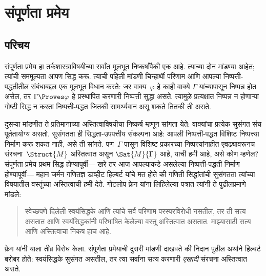 \chapter{संपूर्णता प्रमेय}\label{fol:com::chap}









\section{परिचय}\label{fol:com:int:sec}

संपूर्णता प्रमेय हा तर्कशास्त्राविषयीच्या सर्वांत मूलभूत निष्कर्षांपैकी एक
आहे. त्याच्या दोन मांडण्या आहेत; त्यांची सममूल्यता आपण सिद्ध करू. त्याची
पहिली मांडणी चिन्हार्थी परिणाम आणि आपल्या निष्पत्ती-पद्धतीतील संबंधाबद्दल
एक मूलभूत विधान करते: जर वाक्य~$\varphi$ हे काही वाक्ये
$\Gamma$ यांच्यापासून निष्पन्न होत असेल, तर $\Gamma \Proves \varphi$ हे
प्रस्थापित करणारी निष्पत्ती सुद्धा असते. त्यामुळे प्रत्यक्षात निष्पन्न
न होणाऱ्या गोष्टी सिद्ध न करता निष्पत्ती-पद्धत जितकी सामर्थ्यवान असू
शकते तितकी ती असते.

दुसऱ्या मांडणीत ते प्रतिमानाच्या अस्तित्वाविषयीचा निष्कर्ष म्हणून सांगता येते:
वाक्यांचा प्रत्येक सुसंगत संच पूर्ततायोग्य असतो. सुसंगतता ही
सिद्धता-उपपत्तीय संकल्पना आहे: आपली निष्पत्ती-पद्धत विशिष्ट
निष्पत्त्या निर्माण करू शकत नाही, असे ती सांगते. पण~$\Gamma$ पासून
विशिष्ट प्रकारच्या निष्पत्त्यांनाहीत एवढ्यावरूनच
संरचना~$\Struct{M}$
अस्तित्वात असून $\Sat{M}{\Gamma}$ आहे, याची हमी
आहे, असे कोण म्हणेल? संपूर्णता प्रमेय प्रथम सिद्ध होण्यापूर्वी---
खरे तर आज आपल्याकडे असलेल्या निष्पत्ती-पद्धती निर्माण होण्यापूर्वी---
महान जर्मन गणितज्ञ डाव्हीट हिल्बर्ट यांचे मत होते की गणिती सिद्धांतांची
सुसंगतता त्यांच्या विषयातील वस्तूंच्या अस्तित्वाची हमी देते. गोटलोप फ्रेग
यांना लिहिलेल्या पत्रात त्यांनी ते पुढीलप्रमाणे मांडले:
\begin{quote}
  स्वेच्छपणे दिलेली स्वयंसिद्धके आणि त्यांचे सर्व परिणाम परस्परविरोधी नसतील,
  तर ती सत्य असतात आणि स्वयंसिद्धकांनी परिभाषित केलेल्या वस्तू अस्तित्वात
  असतात. माझ्यासाठी सत्य आणि अस्तित्वाचा निकष हाच आहे.
\end{quote}
फ्रेग यांनी याला तीव्र विरोध केला. संपूर्णता प्रमेयाची दुसरी मांडणी दाखवते
की निदान पुढील अर्थाने हिल्बर्ट बरोबर होते: स्वयंसिद्धके सुसंगत असतील, तर
त्या सर्वांना सत्य करणारी \emph{एखादी}
संरचना अस्तित्वात असते.

